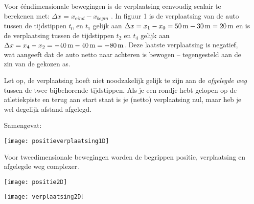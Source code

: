 \documentclass{ximera}
\begin{document}
Voor ééndimensionale bewegingen is de verplaatsing eenvoudig scalair te berekenen met: $\Delta x$ = $x_{eind}-x_{begin}$ .
In figuur 1 is de verplaatsing van de auto tussen de tijdstippen $t_0$ en $t_1$ gelijk aan $\Delta x = x_1-x_0=50\rm\,m-30\rm\,m=20\rm\,m$ en is de verplaatsing tussen de tijdstippen $t_2$ en $t_4$ gelijk aan $\Delta x=x_4-x_2=-40\rm\,m-40\rm\,m=-80\rm\,m$. Deze laatste verplaatsing is negatief, wat aangeeft dat de auto netto naar achteren is bewogen -- tegengesteld aan de zin van de gekozen as.

Let op, de verplaatsing hoeft niet noodzakelijk gelijk te zijn aan de \emph{afgelegde weg} tussen de twee bijbehorende tijdstippen. Als je een rondje hebt gelopen op de atletiekpiste en terug aan start staat is je (netto) verplaatsing nul, maar heb je wel degelijk afstand afgelegd.

Samengevat:

\begin{image}
\texttt{[image: positieverplaatsing1D]}

\end{image}

Voor tweedimensionale bewegingen worden de begrippen positie, verplaatsing en afgelegde weg complexer.

\begin{image}
\texttt{[image: positie2D]}

\end{image}

\begin{image}
\texttt{[image: verplaatsing2D]}

\end{image}

	
\end{document}
